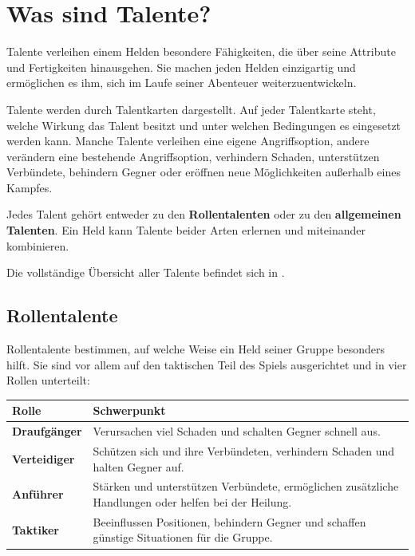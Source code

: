 \chapter{Was sind Talente?}
\label{chap:talents}

Talente verleihen einem Helden besondere Fähigkeiten, die über seine Attribute und Fertigkeiten hinausgehen. Sie machen jeden Helden einzigartig und ermöglichen es ihm, sich im Laufe seiner Abenteuer weiterzuentwickeln.

Talente werden durch Talentkarten dargestellt. Auf jeder Talentkarte steht, welche Wirkung das Talent besitzt und unter welchen Bedingungen es eingesetzt werden kann. Manche Talente verleihen eine eigene Angriffsoption, andere verändern eine bestehende Angriffsoption, verhindern Schaden, unterstützen Verbündete, behindern Gegner oder eröffnen neue Möglichkeiten außerhalb eines Kampfes.

Jedes Talent gehört entweder zu den \textbf{Rollentalenten} oder zu den \textbf{allgemeinen Talenten}. Ein Held kann Talente beider Arten erlernen und miteinander kombinieren.

Die vollständige Übersicht aller Talente befindet sich in .

\section{Rollentalente}

Rollentalente bestimmen, auf welche Weise ein Held seiner Gruppe besonders hilft. Sie sind vor allem auf den taktischen Teil des Spiels ausgerichtet und in vier Rollen unterteilt:

\begin{center}
\renewcommand{\arraystretch}{1.25}
\begin{tabularx}{\textwidth}{|p{2.8cm}|X|}
\hline
\textbf{Rolle} & \textbf{Schwerpunkt} \\
\hline
\textbf{Draufgänger} & Verursachen viel Schaden und schalten Gegner schnell aus. \\
\hline
\textbf{Verteidiger} & Schützen sich und ihre Verbündeten, verhindern Schaden und halten Gegner auf. \\
\hline
\textbf{Anführer} & Stärken und unterstützen Verbündete, ermöglichen zusätzliche Handlungen oder helfen bei der Heilung. \\
\hline
\textbf{Taktiker} & Beeinflussen Positionen, behindern Gegner und schaffen günstige Situationen für die Gruppe. \\
\hline
\end{tabularx}
\end{center}

